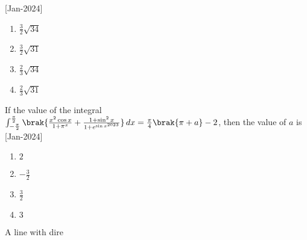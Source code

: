     \hfill{[Jan-2024]}
        \begin{enumerate}
            \item $\frac{3}{2}\sqrt{34}$
            \item $\frac{3}{2}\sqrt{31}$
            \item $\frac{2}{3}\sqrt{34}$
            \item $\frac{2}{3}\sqrt{31}$
        \end{enumerate}
    \item If the value of the integral $\int_{-\frac{\pi}{2}}^{\frac{\pi}{2}}\brak{\frac{x^2\cos{x}}{1+\pi^x}+\frac{1+\sin^2{x}}{1+e^{\sin{x}^{2023}}}} \, dx=\frac{\pi}{4}\brak{\pi+a}-2$, then the value of $a$ is 
    \hfill{[Jan-2024]}
        \begin{enumerate}
            \item $2$
            \item $-\frac{3}{2}$
            \item $\frac{3}{2}$
            \item $3$
        \end{enumerate}
    \item A line with dire
